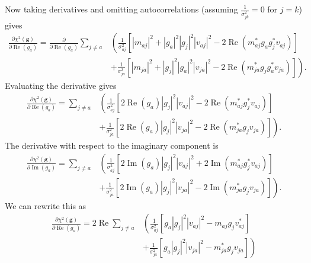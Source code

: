 \documentclass{article}
\newcommand\re{\operatorname{Re}}
\newcommand\im{\operatorname{Im}}
\begin{document}
Now taking derivatives and omitting autocorrelations (assuming $\frac{1}{\sigma_{jk}^2} = 0$ for $j=k$) gives
\begin{equation}
\begin{split}
    \frac{\partial \chi^2(\boldsymbol{g})}{\partial \re(g_a)} = \frac{\partial}{\partial \re(g_a)} \sum_{j \ne a} & \left( \frac{1}{\sigma_{aj}^2} \left[ |m_{aj}|^2 + |g_a|^2 |g_j|^2 |v_{aj}|^2 - 2 \re \left( m_{aj}^* g_a g_j^* v_{aj} \right) \right] \right. \\
    &\left. + \frac{1}{\sigma_{ja}^2} \left[ |m_{ja}|^2 + |g_j|^2 |g_a|^2 |v_{ja}|^2 - 2 \re \left( m_{ja}^* g_j g_a^* v_{ja} \right) \right] \right).
\end{split}
\end{equation}
Evaluating the derivative gives
\begin{equation}
\begin{split}
    \frac{\partial \chi^2(\boldsymbol{g})}{\partial \re(g_a)} = \sum_{j \ne a} 
    & \left( \frac{1}{\sigma_{aj}^2} \left[ 2 \re(g_a) |g_j|^2 |v_{aj}|^2 - 2 \re \left( m_{aj}^* g_j^* v_{aj} \right) \right] \right. \\
    &\left. + \frac{1}{\sigma_{ja}^2} \left[ 2 \re(g_a) |g_j|^2 |v_{ja}|^2 - 2 \re \left( m_{ja}^* g_j v_{ja} \right) \right] \right).
\end{split}
\end{equation}
The derivative with respect to the imaginary component is
\begin{equation}
\begin{split}
    \frac{\partial \chi^2(\boldsymbol{g})}{\partial \im(g_a)} = \sum_{j \ne a} 
    & \left( \frac{1}{\sigma_{aj}^2} \left[ 2 \im(g_a) |g_j|^2 |v_{aj}|^2 + 2 \im \left( m_{aj}^* g_j^* v_{aj} \right) \right] \right. \\
    &\left. + \frac{1}{\sigma_{ja}^2} \left[ 2 \im(g_a) |g_j|^2 |v_{ja}|^2 - 2 \im \left( m_{ja}^* g_j v_{ja} \right) \right] \right).
\end{split}
\end{equation}
We can rewrite this as
\begin{equation}
\begin{split}
    \frac{\partial \chi^2(\boldsymbol{g})}{\partial \re(g_a)} = 2 \re \sum_{j \ne a} 
    & \left( \frac{1}{\sigma_{aj}^2} \left[ g_a |g_j|^2 |v_{aj}|^2 - m_{aj} g_j v_{aj}^* \right] \right. \\
    &\left. + \frac{1}{\sigma_{ja}^2} \left[ g_a |g_j|^2 |v_{ja}|^2 - m_{ja}^* g_j v_{ja} \right] \right)
\end{split}
\end{equation}
\end{document}
